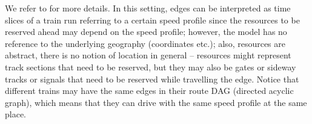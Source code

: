 \documentclass{article}
\begin{document}
We refer to \cite{DBLP:journals/corr/abs-2003-08598} for more details.
In this setting, edges can be interpreted as time slices of a train run referring to a certain speed profile since the resources to be reserved ahead may depend on the speed profile; however, the model has no reference to the underlying geography (coordinates etc.); also, resources are abstract, there is no notion of location in general -- resources might represent track sections that need to be reserved, but they may also be gates or sideway tracks or signals that need to be reserved while travelling the edge. Notice that different trains may have the same edges in their route DAG (directed acyclic graph), which means that they can drive with the same speed profile at the same place.
\end{document}
